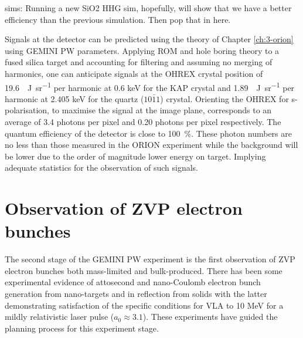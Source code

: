 sims:
Running a new SiO2 HHG sim, hopefully, will show that we have a better efficiency than the previous simulation. Then pop that in here.

Signals at the detector can be predicted using the theory of Chapter \ref{ch:3-orion} using GEMINI PW parameters. Applying ROM and hole boring theory to a fused silica target and accounting for filtering and assuming no merging of harmonics, one can anticipate signals at the OHREX crystal position of \qty{19.6}{\mu J.sr^{-1}} per harmonic at 0.6 keV for the KAP crystal and \qty{1.89}{\mu J.sr^{-1}} per harmonic at 2.405 keV for the quartz ($10\bar{1}1$) crystal. Orienting the OHREX for s-polarisation, to maximise the signal at the image plane, corresponds to an average of 3.4 photons per pixel and 0.20 photons per pixel respectively. The quantum efficiency of the detector is close to \qty{100}{\%}. These photon numbers are no less than those measured in the ORION experiment while the background will be lower due to the order of magnitude lower energy on target. Implying adequate statistics for the observation of such signals.


\section{Observation of ZVP electron bunches}\label{sec:ch4-zvp}
The second stage of the GEMINI PW experiment is the first observation of ZVP electron bunches both mass-limited and bulk-produced. There has been some experimental evidence of attosecond and nano-Coulomb electron bunch generation from nano-targets \cite{cardenasSubcycleDynamicsRelativistic2019,hornyGenerationSingleAttosecond2021} and in reflection from solids \cite{linIsolatedAttosecondElectron2020, thevenetVacuumLaserAcceleration2016} with the latter demonstrating satisfaction of the specific conditions for \ac{VLA} to 10 MeV for a mildly relativistic laser pulse ($a_0 \approx 3.1$). These experiments have guided the planning process for this experiment stage.

